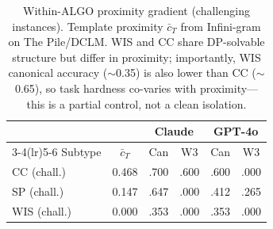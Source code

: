 \begin{table}[t]
  \centering
  \small
  \caption{Within-ALGO proximity gradient (challenging instances). Template
  proximity $\bar{c}_T$ from Infini-gram on The Pile/DCLM. WIS and CC share
  DP-solvable structure but differ in proximity; importantly, WIS canonical
  accuracy ($\sim$0.35) is also lower than CC ($\sim$0.65), so task hardness
  co-varies with proximity---this is a partial control, not a clean
  isolation.}
  \label{tab:proximity}
  \begin{tabular}{lccccc}
    \toprule
    & & \multicolumn{2}{c}{Claude} & \multicolumn{2}{c}{GPT-4o} \\
    \cmidrule(lr){3-4}\cmidrule(lr){5-6}
    Subtype & $\bar{c}_T$ & Can & W3 & Can & W3 \\
    \midrule
    CC (chall.)  & 0.468 & .700 & .600 & .600 & .000 \\
    SP (chall.)  & 0.147 & .647 & .000 & .412 & .265 \\
    WIS (chall.) & 0.000 & .353 & .000 & .353 & .000 \\
    \bottomrule
  \end{tabular}
\end{table}
